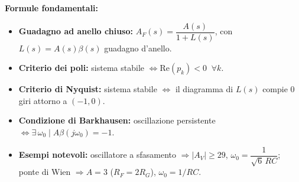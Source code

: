 \begin{note}
\textbf{Formule fondamentali:}
\begin{itemize}
    \item \textbf{Guadagno ad anello chiuso:} $A_F(s) = \dfrac{A(s)}{1+L(s)}$, con $L(s) = A(s)\beta(s)$ guadagno d'anello.
    \item \textbf{Criterio dei poli:} sistema stabile $\iff \text{Re}(p_k) < 0 \;\; \forall k$.
    \item \textbf{Criterio di Nyquist:} sistema stabile $\iff$ il diagramma di $L(s)$ compie $0$ giri attorno a $(-1,0)$.
    \item \textbf{Condizione di Barkhausen:} oscillazione persistente $\iff \exists\, \omega_0 \mid A\beta(j\omega_0) = -1$.
    \item \textbf{Esempi notevoli:} oscillatore a sfasamento $\Rightarrow |A_V| \ge 29$, $\omega_0 = \dfrac{1}{\sqrt6\,RC}$; ponte di Wien $\Rightarrow A=3$ ($R_F=2R_G$), $\omega_0 = 1/RC$.
\end{itemize}
\end{note}

